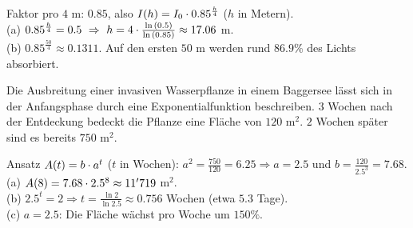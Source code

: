 \documentclass[11pt]{exam}
\begin{document}
\begin{questions}
{\begin{solution}
		Faktor pro $4$ m: $0.85$, also $I(h)=I_0\cdot0.85^{\frac{h}{4}}$ ($h$ in Metern).\\
		(a) $0.85^{\frac{h}{4}}=0.5\ \Rightarrow\ h=4\*\frac{\ln{0.5}}{\ln{0.85}}\approx17.06$ m.\\
		(b) $0.85^{\frac{50}{4}}\approx0.1311$. Auf den ersten $50$ m werden rund $86.9\%$ des Lichts absorbiert.
\end{solution}}
{}

\question[6]
Die Ausbreitung einer invasiven Wasserpflanze in einem Baggersee lässt sich in der Anfangsphase durch eine Exponentialfunktion beschreiben. $3$ Wochen nach der Entdeckung bedeckt die Pflanze eine Fläche von $120$ m$^2$. $2$ Wochen später sind es bereits $750$ m$^2$.
{\begin{solution}
		Ansatz $A(t)=b\cdot a^t$ ($t$ in Wochen): $a^2=\frac{750}{120}=6.25\Rightarrow a=2.5$ und $b=\frac{120}{2.5^3}=7.68$.\\
		(a) $A(8)=7.68\cdot2.5^8\approx11'719$ m$^2$.\\
		(b) $2.5^t=2\Rightarrow t=\frac{\ln{2}}{\ln{2.5}}\approx0.756$ Wochen (etwa $5.3$ Tage).\\
		(c) $a=2.5$: Die Fläche wächst pro Woche um $150\%$.
\end{solution}}
{}


\end{questions}
\end{document}
